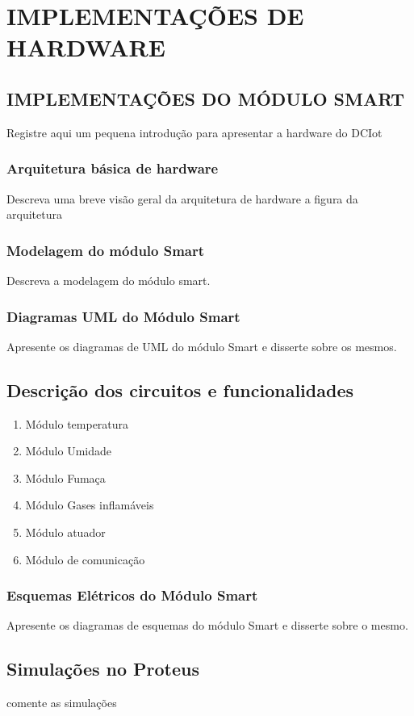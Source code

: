 \chapter{IMPLEMENTAÇÕES DE HARDWARE}


\section{IMPLEMENTAÇÕES DO MÓDULO SMART}
Registre aqui um pequena introdução para apresentar a hardware do DCIot
\subsection{Arquitetura básica de hardware}
Descreva uma breve visão geral da arquitetura de hardware a figura da arquitetura
\subsection{Modelagem do módulo Smart}
Descreva a modelagem do módulo smart.

\subsection{Diagramas UML do Módulo Smart}
Apresente os diagramas de UML do módulo Smart e disserte sobre os mesmos.

\section{Descrição dos circuitos e funcionalidades }

\begin{enumerate}
\item Módulo temperatura
\item Módulo Umidade
\item Módulo Fumaça
\item Módulo Gases inflamáveis
\item Módulo atuador
\item Módulo de comunicação
\end{enumerate}


\subsection{Esquemas Elétricos do Módulo Smart}
Apresente os diagramas de esquemas do módulo Smart e disserte sobre o mesmo.
\section{Simulações no Proteus}
comente as simulações
